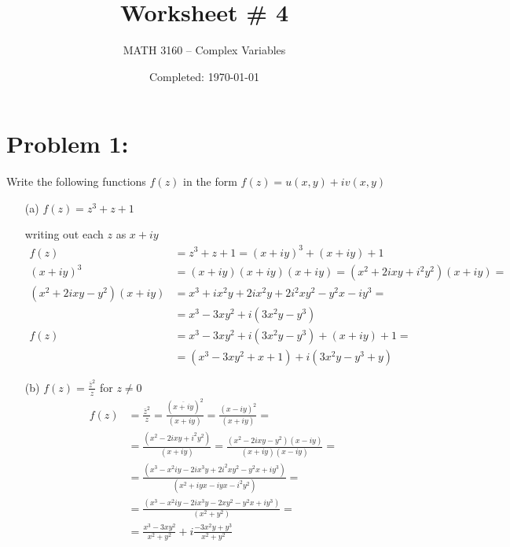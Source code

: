 \documentclass{article}
\title{Worksheet \# 4}
\author{
  MATH 3160 -- Complex Variables\\
  \myauthor
}
\date{Completed: \today}
\begin{document}
\maketitle %


\section*{Problem 1:}
Write the following functions $f(z)$ in the form $f(z) = u(x,y) + iv(x,y)$

\begin{enumerate}
\item[(a)] $f(z) = z^3 + z + 1$

  writing out each $z$ as $x+iy$ 
  \begin{align*}
    f(z) &= z^3 + z + 1 = (x+iy)^3 + (x+iy) + 1 \\
    (x+iy)^3 &= (x+iy)(x+iy)(x+iy) = (x^2+2ixy+i^2y^2)(x+iy) = \\
    (x^2+2ixy-y^2)(x+iy) &= x^3+ix^2y + 2ix^2y + 2i^2xy^2-y^2x-iy^3 = \\
         &= x^3- 3xy^2+i(3x^2y -y^3) \\
    f(z) &= x^3- 3xy^2+i(3x^2y -y^3) + (x+iy) + 1 = \\
    &= \boxed{(x^3- 3xy^2+ x + 1) + i(3x^2y -y^3 + y)}
  \end{align*}
\item[(b)] $f(z) = \frac{\bar{z}^2}{z}$ for $z \neq 0$
  \begin{align*}
    f(z) &= \frac{\bar{z}^2}{z} = \frac{(\overline{x+iy})^2}{(x+iy)} = \frac{(x-iy)^2}{(x+iy)} = \\
         &= \frac{(x^2-2ixy+i^2y^2)}{(x+iy)}= \frac{(x^2-2ixy-y^2)(x-iy)}{(x+iy)(x-iy)} =\\
         &= \frac{(x^3-x^2iy-2ix^3y+2i^2xy^2-y^2x+iy^3)}{(x^2+iyx-iyx -i^2y^2)} =\\
         &= \frac{(x^3-x^2iy-2ix^3y-2xy^2-y^2x+iy^3)}{(x^2+y^2)} = \\
    &= \boxed{\frac{x^3-3xy^2}{x^2+y^2} + i\frac{-3x^2y+y^3}{x^2+y^2}}
  \end{align*}
\end{enumerate}
\begin{align*}
\end{align*}
\end{document}
